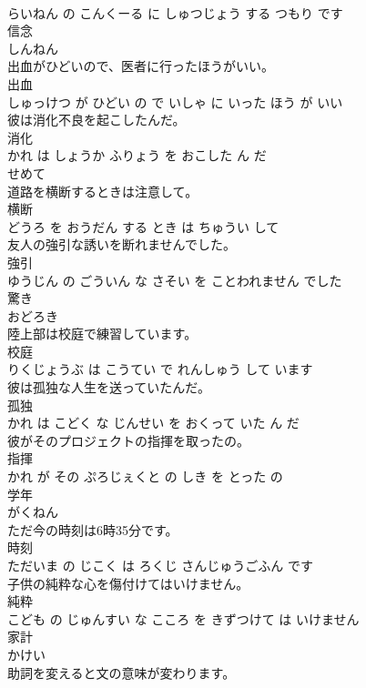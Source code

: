 \documentclass[8pt]{extreport}
\begin{document}
\begin{CJK}{UTF8}{min}
\\	らいねん の こんくーる に しゅつじょう する つもり です			
\\	信念	
\\	しんねん		
\\	出血がひどいので、医者に行ったほうがいい。	
\\	出血 
\\	しゅっけつ が ひどい の で いしゃ に いった ほう が いい			
\\	彼は消化不良を起こしたんだ。	
\\	消化 
\\	かれ は しょうか ふりょう を おこした ん だ			
\\	せめて	
\\	道路を横断するときは注意して。	
\\	横断 
\\	どうろ を おうだん する とき は ちゅうい して			
\\	友人の強引な誘いを断れませんでした。	
\\	強引 
\\	ゆうじん の ごういん な さそい を ことわれません でした			
\\	驚き	
\\	おどろき		
\\	陸上部は校庭で練習しています。	
\\	校庭 
\\	りくじょうぶ は こうてい で れんしゅう して います			
\\	彼は孤独な人生を送っていたんだ。	
\\	孤独 
\\	かれ は こどく な じんせい を おくって いた ん だ			
\\	彼がそのプロジェクトの指揮を取ったの。	
\\	指揮 
\\	かれ が その ぷろじぇくと の しき を とった の			
\\	学年	
\\	がくねん		
\\	ただ今の時刻は6時35分です。	
\\	時刻 
\\	ただいま の じこく は ろくじ さんじゅうごふん です			
\\	子供の純粋な心を傷付けてはいけません。	
\\	純粋 
\\	こども の じゅんすい な こころ を きずつけて は いけません			
\\	家計	
\\	かけい		
\\	助詞を変えると文の意味が変わります。	

\end{CJK}
\end{document}

